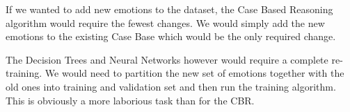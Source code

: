 \documentclass[a4paper]{article}
\begin{document}
If we wanted to add new emotions to the dataset, the Case Based Reasoning algorithm would require the fewest changes. We would simply add the new emotions to the existing Case Base which would be the only required change. \medskip

The Decision Trees and Neural Networks however would require a complete re-training. We would need to partition the new set of emotions together with the old ones into training and validation set and then run the training algorithm. This is obviously a more laborious task than for the CBR.

\clearpage

\end{document}

